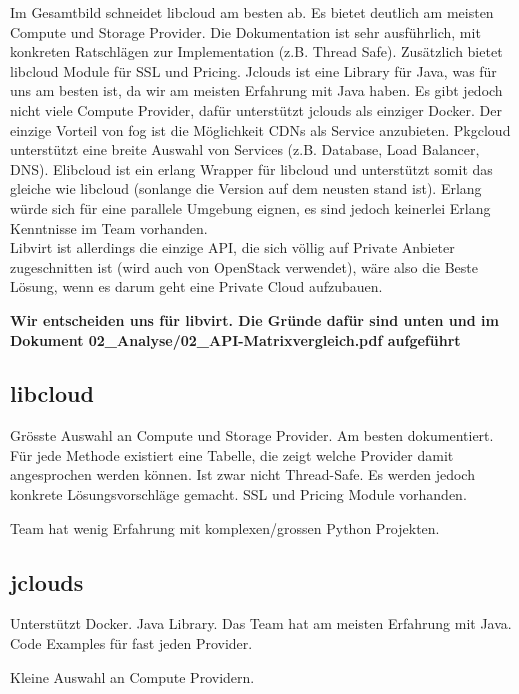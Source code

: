 \documentclass[11pt]{scrartcl}
\begin{document}
Im Gesamtbild schneidet libcloud am besten ab. Es bietet deutlich am meisten Compute und 
Storage Provider. Die Dokumentation ist sehr ausführlich, mit konkreten Ratschlägen zur 
Implementation (z.B. Thread Safe). Zusätzlich bietet libcloud Module für SSL und Pricing.
Jclouds ist eine Library für Java, was für uns am besten ist, da wir am meisten Erfahrung mit 
Java haben. Es gibt jedoch nicht viele Compute Provider, dafür unterstützt jclouds als einziger Docker.
Der einzige Vorteil von fog ist die Möglichkeit CDNs als Service anzubieten.
Pkgcloud unterstützt eine breite Auswahl von Services (z.B. Database, Load Balancer, DNS).
Elibcloud ist ein erlang Wrapper für libcloud und unterstützt somit das gleiche wie libcloud 
(sonlange die Version auf dem neusten stand ist). Erlang würde sich für eine parallele Umgebung eignen, 
es sind jedoch keinerlei Erlang Kenntnisse im Team vorhanden.\\
Libvirt ist allerdings die einzige API, die sich völlig auf Private Anbieter 
zugeschnitten ist (wird auch von OpenStack verwendet), wäre also die Beste 
Lösung, wenn es darum geht eine Private Cloud aufzubauen.

\textbf{Wir entscheiden uns für libvirt. Die Gründe dafür sind unten und im Dokument 
02\_Analyse\//02\_API-Matrixvergleich.pdf aufgeführt}


\subsection{libcloud}
\begin{Argumentation}
\pro Grösste Auswahl an Compute und Storage Provider.
\pro Am besten dokumentiert. Für jede Methode existiert eine Tabelle, die zeigt welche Provider damit angesprochen werden können.
\pro Ist zwar nicht Thread-Safe. Es werden jedoch konkrete Lösungsvorschläge gemacht.
\pro SSL und Pricing Module vorhanden.

\contra Team hat wenig Erfahrung mit komplexen/grossen Python Projekten.
\end{Argumentation}

\subsection{jclouds}
\begin{Argumentation}
\pro Unterstützt Docker.
\pro Java Library. Das Team hat am meisten Erfahrung mit Java.
\pro Code Examples für fast jeden Provider.

\contra Kleine Auswahl an Compute Providern.
\end{Argumentation}
\end{document}
